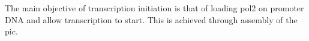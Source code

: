 The main objective of transcription initiation is that of loading \gls{pol2} on promoter DNA and allow transcription to start. This is achieved through assembly of the \gls{pic}. 





